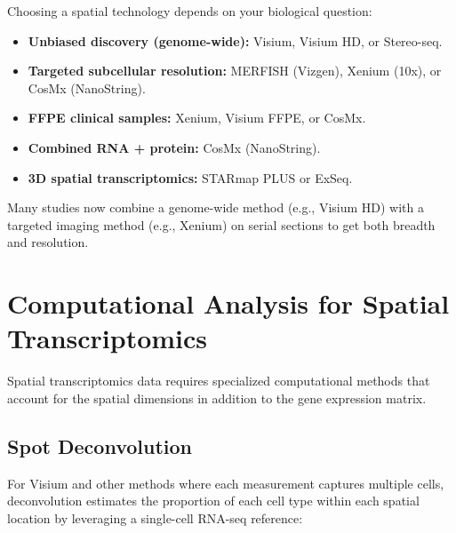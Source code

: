 \begin{tipbox}
Choosing a spatial technology depends on your biological question:
\begin{itemize}[nosep]
  \item \textbf{Unbiased discovery (genome-wide):} Visium, Visium HD, or
    Stereo-seq.
  \item \textbf{Targeted subcellular resolution:} MERFISH (Vizgen), Xenium
    (10x), or CosMx (NanoString).
  \item \textbf{FFPE clinical samples:} Xenium, Visium FFPE, or CosMx.
  \item \textbf{Combined RNA + protein:} CosMx (NanoString).
  \item \textbf{3D spatial transcriptomics:} STARmap PLUS or ExSeq.
\end{itemize}
Many studies now combine a genome-wide method (e.g., Visium HD) with a targeted
imaging method (e.g., Xenium) on serial sections to get both breadth and
resolution.
\end{tipbox}


\section{Computational Analysis for Spatial Transcriptomics}
\label{sec:spatial:computation}

Spatial transcriptomics data requires specialized computational methods that
account for the spatial dimensions in addition to the gene expression matrix.

\subsection{Spot Deconvolution}
\label{sec:spatial:deconv}

For Visium and other methods where each measurement captures multiple cells,
deconvolution estimates the proportion of each cell type within each spatial
location by leveraging a single-cell RNA-seq reference:

